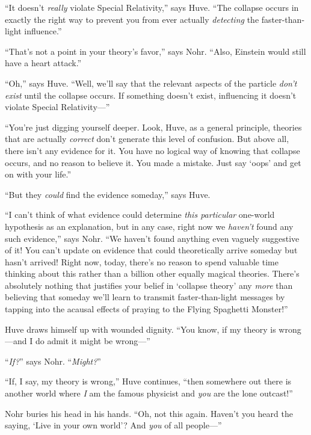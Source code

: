 {
 ``It doesn't \textit{really}
violate Special Relativity,'' says Huve.
``The collapse occurs in exactly the right way to
prevent you from ever actually \textit{detecting} the faster-than-light
influence.''}

{
 ``That's not a point in your
theory's favor,'' says Nohr.
``Also, Einstein would still have a heart
attack.''}

{
 ``Oh,'' says Huve.
``Well, we'll say that the relevant
aspects of the particle \textit{don't exist} until the
collapse occurs. If something doesn't exist,
influencing it doesn't violate Special
Relativity---''}

{
 ``You're just digging yourself
deeper. Look, Huve, as a general principle, theories that are actually
\textit{correct} don't generate this level of
confusion. But above all, there isn't any evidence for
it. You have no logical way of knowing that collapse occurs, and no
reason to believe it. You made a mistake. Just say
`oops' and get on with your
life.''}

{
 ``But they \textit{could} find the evidence
someday,'' says Huve.}

{
 ``I can't think of what evidence
could determine \textit{this particular} one-world hypothesis as an
explanation, but in any case, right now we
\textit{haven't} found any such
evidence,'' says Nohr. ``We
haven't found anything even vaguely suggestive of it!
You can't update on evidence that could theoretically
arrive someday but hasn't arrived! Right now, today,
there's no reason to spend valuable time thinking about
this rather than a billion other equally magical theories.
There's absolutely nothing that justifies your belief
in `collapse theory' any \textit{more}
than believing that someday we'll learn to transmit
faster-than-light messages by tapping into the acausal effects of
praying to the Flying Spaghetti Monster!''}

{
 Huve draws himself up with wounded dignity. ``You
know, if my theory is wrong---and I do admit it might be
wrong---''}

{
 ``\textit{If?}'' says Nohr.
``\textit{Might?}''}

{
 ``If, I say, my theory is
wrong,'' Huve continues, ``then
somewhere out there is another world where \textit{I} am the famous
physicist and \textit{you} are the lone outcast!''}

{
 Nohr buries his head in his hands. ``Oh, not this
again. Haven't you heard the saying,
`Live in your own world'? And
\textit{you} of all people---''}

